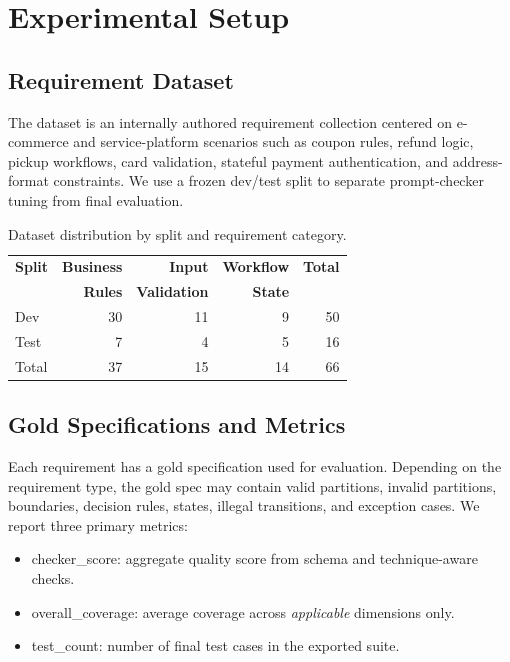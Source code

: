 \documentclass{article}
\renewcommand{\texttt}[1]{{\normalfont #1}}
\begin{document}
\section{Experimental Setup}
\subsection{Requirement Dataset}
The dataset is an internally authored requirement collection centered on e-commerce and service-platform scenarios such as coupon rules, refund logic, pickup workflows, card validation, stateful payment authentication, and address-format constraints. We use a frozen \texttt{dev}/\texttt{test} split to separate prompt-checker tuning from final evaluation.

\begin{table}[h]
\centering
\small
\caption{Dataset distribution by split and requirement category.}
\label{tab:dataset}
\begin{tabular}{lrrrr}
\toprule
\textbf{Split} & \textbf{Business} & \textbf{Input} & \textbf{Workflow} & \textbf{Total} \\
 & \textbf{Rules} & \textbf{Validation} & \textbf{State} & \\
\midrule
Dev & 30 & 11 & 9 & 50 \\
Test & 7 & 4 & 5 & 16 \\
Total & 37 & 15 & 14 & 66 \\
\bottomrule
\end{tabular}
\end{table}

\subsection{Gold Specifications and Metrics}
Each requirement has a gold specification used for evaluation. Depending on the requirement type, the gold spec may contain valid partitions, invalid partitions, boundaries, decision rules, states, illegal transitions, and exception cases. We report three primary metrics:
\begin{itemize}[leftmargin=1.5em]
\item \texttt{checker\_score}: aggregate quality score from schema and technique-aware checks.
\item \texttt{overall\_coverage}: average coverage across \emph{applicable} dimensions only.
\item \texttt{test\_count}: number of final test cases in the exported suite.
\end{itemize}
\end{document}
